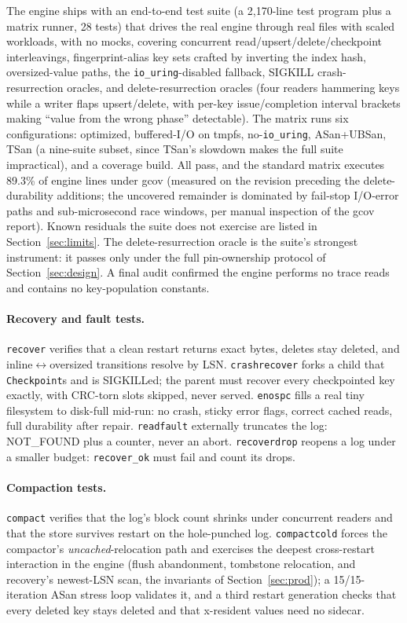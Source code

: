 \documentclass{article}
\begin{document}
The engine ships with an end-to-end test suite (a 2{,}170-line test program plus a matrix runner, 28 tests) that drives the real engine through real files with scaled workloads, with no mocks, covering concurrent read/upsert/delete/checkpoint interleavings, fingerprint-alias key sets crafted by inverting the index hash, oversized-value paths, the \texttt{io\_uring}-disabled fallback, SIGKILL crash-resurrection oracles, and delete-resurrection oracles (four readers hammering keys while a writer flaps upsert/delete, with per-key issue/completion interval brackets making ``value from the wrong phase'' detectable). The matrix runs six configurations: optimized, buffered-I/O on tmpfs, no-\texttt{io\_uring}, ASan+UBSan, TSan (a nine-suite subset, since TSan's slowdown makes the full suite impractical), and a coverage build. All pass, and the standard matrix executes 89.3\% of engine lines under gcov (measured on the revision preceding the delete-durability additions; the uncovered remainder is dominated by fail-stop I/O-error paths and sub-microsecond race windows, per manual inspection of the gcov report). Known residuals the suite does not exercise are listed in Section~\ref{sec:limits}. The delete-resurrection oracle is the suite's strongest instrument: it passes only under the full pin-ownership protocol of Section~\ref{sec:design}. A final audit confirmed the engine performs no trace reads and contains no key-population constants.

\paragraph{Recovery and fault tests.}
\texttt{recover} verifies that a clean restart returns exact bytes, deletes stay deleted, and inline$\leftrightarrow$oversized transitions resolve by LSN. \texttt{crashrecover} forks a child that \texttt{Checkpoint}s and is SIGKILLed; the parent must recover every checkpointed key exactly, with CRC-torn slots skipped, never served. \texttt{enospc} fills a real tiny filesystem to disk-full mid-run: no crash, sticky error flags, correct cached reads, full durability after repair. \texttt{readfault} externally truncates the log: NOT\_FOUND plus a counter, never an abort. \texttt{recoverdrop} reopens a log under a smaller budget: \texttt{recover\_ok} must fail and count its drops.

\paragraph{Compaction tests.}
\texttt{compact} verifies that the log's block count shrinks under concurrent readers and that the store survives restart on the hole-punched log. \texttt{compactcold} forces the compactor's \emph{uncached}-relocation path and exercises the deepest cross-restart interaction in the engine (flush abandonment, tombstone relocation, and recovery's newest-LSN scan, the invariants of Section~\ref{sec:prod}); a 15/15-iteration ASan stress loop validates it, and a third restart generation checks that every deleted key stays deleted and that x-resident values need no sidecar.
\end{document}
